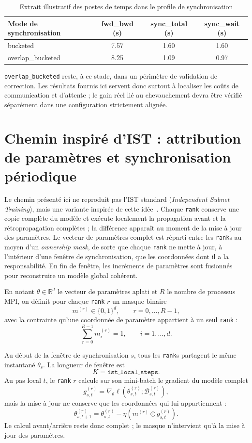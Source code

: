 \documentclass[a4paper,11pt,oneside]{article}
\begin{document}
\begin{table}[h]
\centering
\begin{tabular}{lccc}
\hline
Mode de synchronisation & fwd\_bwd (s) & sync\_total (s) & sync\_wait (s) \\
\hline
bucketed         & 7.57 & 1.60 & 1.60 \\
overlap\_bucketed & 8.25 & 1.09 & 0.97 \\
\hline
\end{tabular}
\caption{Extrait illustratif des postes de temps dans le profile de synchronisation}
\label{tab:mpi_profile}
\end{table}

\texttt{overlap\_bucketed} reste, à ce stade, dans un périmètre de validation de correction. Les résultats fournis ici servent donc surtout à localiser les coûts de communication et d'attente ; le gain réel lié au chevauchement devra être vérifié séparément dans une configuration strictement alignée.

\section{Chemin inspiré d'IST : attribution de paramètres et synchronisation périodique}

Le chemin présenté ici ne reproduit pas l'IST standard (\textit{Independent Subnet Training}), mais une variante inspirée de cette idée~\cite{yuan2022ist}. Chaque \texttt{rank} conserve une copie complète du modèle et exécute localement la propagation avant et la rétropropagation complètes ; la différence apparaît au moment de la mise à jour des paramètres. Le vecteur de paramètres complet est réparti entre les \texttt{rank}s au moyen d'un \textit{ownership mask}, de sorte que chaque \texttt{rank} ne mette à jour, à l'intérieur d'une fenêtre de synchronisation, que les coordonnées dont il a la responsabilité. En fin de fenêtre, les incréments de paramètres sont fusionnés pour reconstruire un modèle global cohérent.

En notant \(\theta \in \mathbb{R}^d\) le vecteur de paramètres aplati et \(R\) le nombre de processus MPI, on définit pour chaque \texttt{rank} \(r\) un masque binaire
\[
m^{(r)} \in \{0,1\}^d, \qquad r=0,\ldots,R-1,
\]
avec la contrainte qu'une coordonnée de paramètre appartient à un seul \texttt{rank} :
\[
\sum_{r=0}^{R-1} m_i^{(r)} = 1, \qquad i=1,\ldots,d.
\]

Au début de la fenêtre de synchronisation \(s\), tous les \texttt{rank}s partagent le même instantané \(\theta_s\). La longueur de fenêtre est
\[
K = \texttt{ist\_local\_steps}.
\]
Au pas local \(t\), le \texttt{rank} \(r\) calcule sur son mini-batch le gradient du modèle complet
\[
g_{s,t}^{(r)}
=
\nabla_\theta \ell\!\left(\theta_{s,t}^{(r)};\mathcal{B}_{s,t}^{(r)}\right),
\]
mais la mise à jour ne conserve que les coordonnées qui lui appartiennent :
\[
\theta_{s,t+1}^{(r)}
=
\theta_{s,t}^{(r)}
-
\eta \left(m^{(r)} \odot g_{s,t}^{(r)}\right).
\]
Le calcul avant/arrière reste donc complet ; le masque n'intervient qu'à la mise à jour des paramètres.
\end{document}
